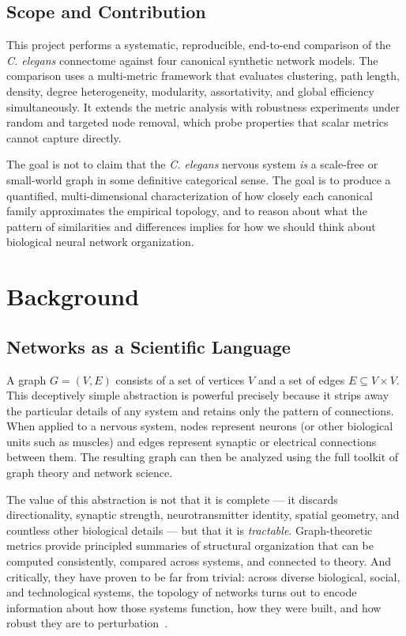 \documentclass[12pt,a4paper]{report}
\begin{document}
\section{Scope and Contribution}

This project performs a systematic, reproducible, end-to-end comparison of the \textit{C. elegans} connectome against four canonical synthetic network models. The comparison uses a multi-metric framework that evaluates clustering, path length, density, degree heterogeneity, modularity, assortativity, and global efficiency simultaneously. It extends the metric analysis with robustness experiments under random and targeted node removal, which probe properties that scalar metrics cannot capture directly.

The goal is not to claim that the \textit{C. elegans} nervous system \textit{is} a scale-free or small-world graph in some definitive categorical sense. The goal is to produce a quantified, multi-dimensional characterization of how closely each canonical family approximates the empirical topology, and to reason about what the pattern of similarities and differences implies for how we should think about biological neural network organization.


\chapter{Background}

\section{Networks as a Scientific Language}

A graph $G = (V, E)$ consists of a set of vertices $V$ and a set of edges $E \subseteq V \times V$. This deceptively simple abstraction is powerful precisely because it strips away the particular details of any system and retains only the pattern of connections. When applied to a nervous system, nodes represent neurons (or other biological units such as muscles) and edges represent synaptic or electrical connections between them. The resulting graph can then be analyzed using the full toolkit of graph theory and network science.

The value of this abstraction is not that it is complete — it discards directionality, synaptic strength, neurotransmitter identity, spatial geometry, and countless other biological details — but that it is \textit{tractable}. Graph-theoretic metrics provide principled summaries of structural organization that can be computed consistently, compared across systems, and connected to theory. And critically, they have proven to be far from trivial: across diverse biological, social, and technological systems, the topology of networks turns out to encode information about how those systems function, how they were built, and how robust they are to perturbation~\cite{newman2010networks}.
\end{document}
